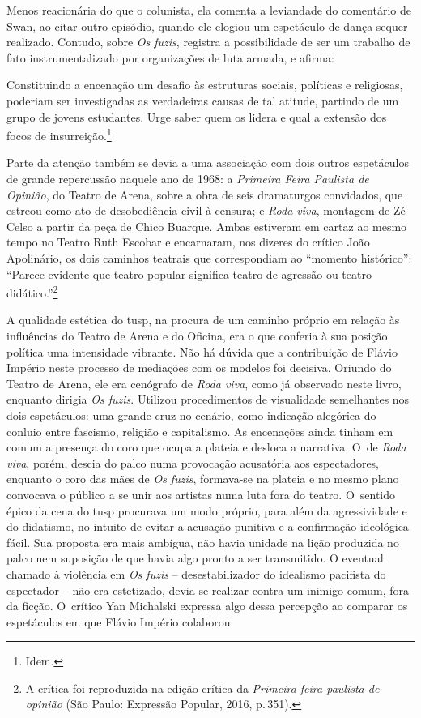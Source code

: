 Menos reacionária do que o colunista, ela comenta a leviandade do
comentário de Swan, ao citar outro episódio, quando ele elogiou um
espetáculo de dança sequer realizado. Contudo, sobre {\it Os fuzis},
registra a possibilidade de ser um trabalho de fato instrumentalizado
por organizações de luta armada, e afirma:

\startblockquote
Constituindo a encenação um desafio às estruturas sociais, políticas e
religiosas, poderiam ser investigadas as verdadeiras causas de tal
atitude, partindo de um grupo de jovens estudantes. Urge saber quem os
lidera e qual a extensão dos focos de insurreição.\footnote{Idem.}
\stopblockquote

Parte da atenção também se devia a uma associação com dois outros
espetáculos de grande repercussão naquele ano de 1968: a {\it Primeira
Feira Paulista de Opinião}, do Teatro de Arena, sobre a obra de seis
dramaturgos convidados, que estreou como ato de desobediência civil à
censura; e {\it Roda viva}, montagem de Zé Celso a partir da peça de
Chico Buarque. Ambas estiveram em cartaz ao mesmo tempo no Teatro Ruth
Escobar e encarnaram, nos dizeres do crítico João Apolinário, os dois
caminhos teatrais que correspondiam ao “momento histórico”: “Parece
evidente que teatro popular significa teatro de agressão ou teatro
didático.”\footnote{A crítica foi reproduzida na edição crítica da
  {\it Primeira feira paulista de opinião} (São Paulo: Expressão
  Popular, 2016, p.\,351).}

A qualidade estética do {\sc tusp}, na procura de um caminho próprio em
relação às influências do Teatro de Arena e do Oficina, era o que
conferia à sua posição política uma intensidade vibrante. Não há dúvida
que a contribuição de Flávio Império neste processo de mediações com os
modelos foi decisiva. Oriundo do Teatro de Arena, ele era cenógrafo de
{\it Roda viva}, como já observado neste livro, enquanto dirigia {\it Os
fuzis}. Utilizou procedimentos de visualidade semelhantes nos dois
espetáculos: uma grande cruz no cenário, como indicação alegórica do
conluio entre fascismo, religião e capitalismo. As encenações ainda
tinham em comum a presença do coro que ocupa a plateia e desloca a
narrativa. O~de {\it Roda viva}, porém, descia do palco numa provocação
acusatória aos espectadores, enquanto o coro das mães de {\it Os fuzis},
formava-se na plateia e no mesmo plano convocava o público a se unir aos
artistas numa luta fora do teatro. O~sentido épico da cena do {\sc tusp}
procurava um modo próprio, para além da agressividade e do didatismo, no
intuito de evitar a acusação punitiva e a confirmação ideológica fácil.
Sua proposta era mais ambígua, não havia unidade na lição produzida no
palco nem suposição de que havia algo pronto a ser transmitido. O
eventual chamado à violência em {\it Os fuzis} -- desestabilizador do
idealismo pacifista do espectador -- não era estetizado, devia se
realizar contra um inimigo comum, fora da ficção. O~crítico Yan
Michalski expressa algo dessa percepção ao comparar os espetáculos em
que Flávio Império colaborou:

